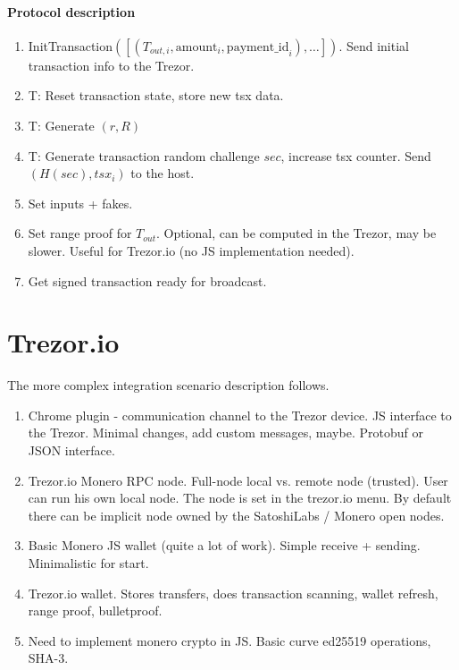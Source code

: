 \documentclass[]{article}
\begin{document}
\paragraph{Protocol description}
\begin{enumerate}
	\item InitTransaction$( [(T_{out,i}, \text{amount}_i, \text{payment\_id}_i), \dots])$. Send initial transaction info to the Trezor.
	
	\item T: Reset transaction state, store new tsx data.
	
	\item T: Generate $(r, R)$
	
	\item T: Generate transaction random challenge $sec$, increase tsx counter. Send $(H(sec), tsx_i)$ to the host. 
	
	\item Set inputs + fakes.
	
	\item Set range proof for $T_{out}$. Optional, can be computed in the Trezor, may be slower. Useful for Trezor.io (no JS implementation needed).
	
	\item Get signed transaction ready for broadcast.
	

\end{enumerate}

\section{Trezor.io}

The more complex integration scenario description follows.
\begin{enumerate}
	\item Chrome plugin - communication channel to the Trezor device. 
	JS interface to the Trezor. Minimal changes, add custom messages, maybe.
	Protobuf or JSON interface.
	
	\item Trezor.io Monero RPC node. Full-node local vs. remote node (trusted). User can run his own local node. The node is set in the trezor.io menu. By default there can be implicit node owned by the SatoshiLabs / Monero open nodes.
	
	\item Basic Monero JS wallet (quite a lot of work). Simple receive + sending. Minimalistic for start.
	
	\item Trezor.io wallet. Stores transfers, does transaction scanning, wallet refresh, range proof, bulletproof. 
	 
	\item Need to implement monero crypto in JS. Basic curve ed25519 operations, SHA-3.
	 
\end{enumerate}
\end{document}
